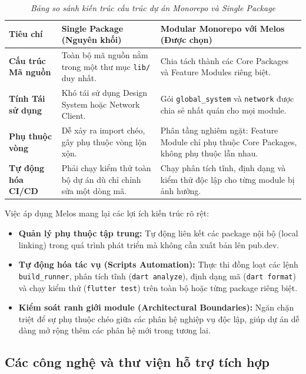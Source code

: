 \begin{table}[H]
    \centering
    \small
    \renewcommand{\arraystretch}{1.25}
    \begin{tabularx}{\textwidth}{|p{3cm}|X|X|}
    \hline
    \textbf{Tiêu chí} & \textbf{Single Package (Nguyên khối)} & \textbf{Modular Monorepo với Melos (Được chọn)} \\
    \hline
    \textbf{Cấu trúc Mã nguồn} & Toàn bộ mã nguồn nằm trong một thư mục \texttt{lib/} duy nhất. & Chia tách thành các Core Packages và Feature Modules riêng biệt. \\
    \hline
    \textbf{Tính Tái sử dụng} & Khó tái sử dụng Design System hoặc Network Client. & Gói \texttt{global\_system} và \texttt{network} được chia sẻ nhất quán cho mọi module. \\
    \hline
    \textbf{Phụ thuộc vòng} & Dễ xảy ra import chéo, gây phụ thuộc vòng lộn xộn. & Phân tầng nghiêm ngặt: Feature Module chỉ phụ thuộc Core Packages, không phụ thuộc lẫn nhau. \\
    \hline
    \textbf{Tự động hóa CI/CD} & Phải chạy kiểm thử toàn bộ dự án dù chỉ chỉnh sửa một dòng mã. & Chạy phân tích tĩnh, định dạng và kiểm thử độc lập cho từng module bị ảnh hưởng. \\
    \hline
    \end{tabularx}
    \caption{\textit{Bảng so sánh kiến trúc cấu trúc dự án Monorepo và Single Package}}
    \label{tab:compare_monorepo}
\end{table}

\noindent Việc áp dụng Melos mang lại các lợi ích kiến trúc rõ rệt:
\begin{itemize}
    \item \textbf{Quản lý phụ thuộc tập trung:} Tự động liên kết các package nội bộ (local linking) trong quá trình phát triển mà không cần xuất bản lên pub.dev.
    \item \textbf{Tự động hóa tác vụ (Scripts Automation):} Thực thi đồng loạt các lệnh \texttt{build\_runner}, phân tích tĩnh (\texttt{dart analyze}), định dạng mã (\texttt{dart format}) và chạy kiểm thử (\texttt{flutter test}) trên toàn bộ hoặc từng package riêng biệt.
    \item \textbf{Kiểm soát ranh giới module (Architectural Boundaries):} Ngăn chặn triệt để sự phụ thuộc chéo giữa các phân hệ nghiệp vụ độc lập, giúp dự án dễ dàng mở rộng thêm các phân hệ mới trong tương lai.
\end{itemize}

\subsection{Các công nghệ và thư viện hỗ trợ tích hợp}
\label{subsec:supporting_tech}

